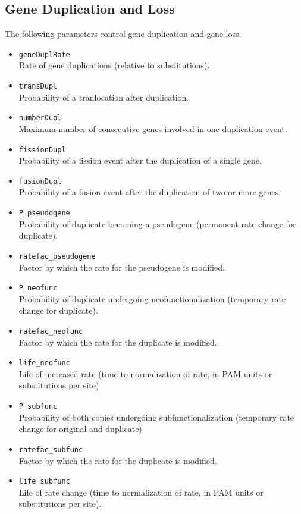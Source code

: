 \documentclass[11pt]{article}
\begin{document}
\subsection{Gene Duplication and Loss}
The following parameters control gene duplication and gene loss.
\begin{itemize}
\item{\texttt{geneDuplRate}} \hfill \\
Rate of gene duplications (relative to substitutions).
\item{\texttt{transDupl}} \hfill \\
Probability of a tranlocation after duplication.
\item{\texttt{numberDupl}} \hfill \\
Maximum number of consecutive genes involved in one duplication event.
\item{\texttt{fissionDupl}} \hfill \\
Probability of a fission event after the duplication of a single gene.
\item{\texttt{fusionDupl}} \hfill \\
Probability of a fusion event after the duplication of two or more genes.
\item{\texttt{P\_pseudogene}} \hfill \\
Probability of duplicate becoming a pseudogene (permanent rate change for duplicate).
\item{\texttt{ratefac\_pseudogene}} \hfill \\
Factor by which the rate for the pseudogene is modified.
\item{\texttt{P\_neofunc}} \hfill \\
Probability of duplicate undergoing neofunctionalization (temporary rate change for duplicate).
\item{\texttt{ratefac\_neofunc}} \hfill \\
Factor by which the rate for the duplicate is modified.
\item{\texttt{life\_neofunc}} \hfill \\
Life of increased rate (time to normalization of rate, in PAM units or substitutions per site)
\item{\texttt{P\_subfunc}} \hfill \\
Probability of both copies undergoing subfunctionalization (temporary rate change for original and duplicate)
\item{\texttt{ratefac\_subfunc}} \hfill \\
Factor by which the rate for the duplicate is modified.
\item{\texttt{life\_subfunc}} \hfill \\
Life of rate change (time to normalization of rate, in PAM units or substitutions per site).
  

\end{itemize}
\end{document}
